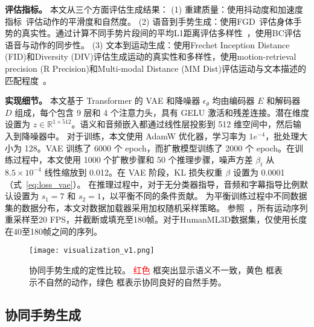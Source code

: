 \textbf{评估指标。}
本文从三个方面评估生成结果：
(1) 重建质量：使用抖动度和加速度指标~\cite{kucherenko2019analyzing}评估动作的平滑度和自然度。
(2) 语音到手势生成：使用FGD~\cite{yoon2020speech}评估身体手势的真实性。通过计算不同手势片段间的平均L1距离评估多样性~\cite{liu2024emage}，使用BC评估语音与动作的同步性。
(3) 文本到运动生成：使用Frechet Inception Distance (FID)和Diversity (DIV)评估生成运动的真实性和多样性，使用motion-retrieval precision (R Precision)和Multi-modal Distance (MM Dist)评估运动与文本描述的匹配程度~\cite{chen2023executing}。

\textbf{实现细节。}
本文基于 Transformer 的 VAE 和降噪器 $\epsilon_\theta$ 均由编码器 $E$ 和解码器 $D$ 组成，每个包含 9 层和 4 个注意力头，具有 GELU 激活和残差连接。潜在维度设置为 $z \in \mathbb{R}^{1 \times 512}$。语义和音频嵌入都通过线性层投影到 512 维空间中，然后输入到降噪器中。
对于训练，本文使用 AdamW 优化器，学习率为 $1e^{-4}$，批处理大小为 128。VAE 训练了 6000 个 epoch，而扩散模型训练了 2000 个 epoch。在训练过程中，本文使用 1000 个扩散步骤和 50 个推理步骤，噪声方差 $\beta_t$ 从 $8.5 \times 10^{-4}$ 线性缩放到 0.012。在 VAE 阶段，KL 损失权重 $\beta$ 设置为 0.0001（式~\eqref{eq:loss_vae}）。
在推理过程中，对于无分类器指导，音频和字幕指导比例默认设置为 $s_1=7$ 和 $s_2=1$，以平衡不同的条件贡献。
为平衡训练过程中不同数据集的数据分布，本文对数据加载器采用加权随机采样策略。
参照~\cite{yang2024freetalker}，所有运动序列重采样至20 FPS，并截断或填充至180帧。对于HumanML3D数据集，仅使用长度在40至180帧之间的序列。

\begin{figure*}[t]
  \centering
  \texttt{[image: visualization\_v1.png]}
  \caption{协同手势生成的定性比较。 \textcolor{red}{红色} 框突出显示语义不一致，\textcolor[RGB]{204,153,0}{黄色} 框表示不自然的动作，\textcolor[RGB]{34,139,34}{绿色} 框表示协同良好的自然手势。}
  \label{fig:method:visualization}
\end{figure*}


\subsection{协同手势生成}
